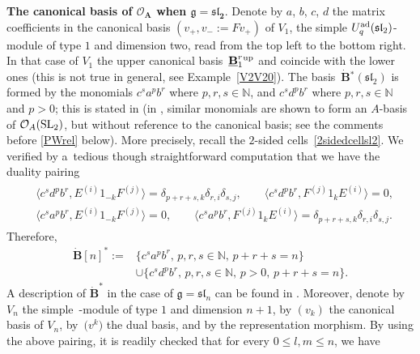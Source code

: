 \documentclass[10pt,a4paper]{amsart}
\numberwithin{equation}{section}
\theoremstyle{definition}
\newcommand{\mn}{\mathbb{N}}
\newcommand{\Oo}{{\mathcal O}}
\begin{document}
{\bf The canonical basis of $\boldsymbol{\Oo_A}$ when $\boldsymbol{\mathfrak{g}={\mathfrak{sl}_2}}$}. Denote by $a$, $b$, $c$, $d$ the matrix coefficients in the canonical basis $(v_+,v_-:=Fv_+)$ of $V_1$, the simple $U_q^{\rm ad}({\mathfrak{sl}_2})$-module of type $1$ and dimension two, read from the top left to the bottom right. In that case of $V_1$ the upper canonical basis~$\underline{\mathbf{B}}_{1}^r{}^{\rm up}$ and  coincide with the lower ones (this is not true in general, see Example~\ref{V2V20}). The basis~$\dot{\mathbf{B}} {}^*({\mathfrak{sl}_2})$ is formed by the monomials $c^sa^pb^r$ where $p,r,s\in \mn$, and $c^sd^pb^r$ where $p,r,s\in \mn$ and $p>0$; this is stated in \cite[Proposition~9.1.1]{Kashiwara2} (in \cite[Proposition~1.3]{DC-L}, similar monomials are shown to form an $A$-basis of $\Oo_A({\rm SL}_2)$, but without reference to the canonical basis; see the comments before \eqref{PWrel} below). More precisely, recall the $2$-sided cells~\eqref{2sidedcellsl2}. We verified by a~tedious though straightforward computation that we have the duality pairing
\begin{gather*}
\begin{split}
& \big\langle c^sd^pb^r, E^{(i)}1_{-k}F^{(j)} \big\rangle = \delta_{p+r+s,k}\delta_{r,i}\delta_{s,j} ,\qquad \big\langle c^sd^pb^r, F^{(j)}1_{k}E^{(i)} \big\rangle =0, \\
& \big\langle c^sa^pb^r, E^{(i)}1_{-k}F^{(j)} \big\rangle = 0 ,\qquad \big\langle c^sa^pb^r, F^{(j)}1_{k}E^{(i)} \big\rangle =\delta_{p+r+s,k}\delta_{r,i}\delta_{s,j}.
\end{split}
\end{gather*}
Therefore, \begin{align*}\dot{\mathbf{B}} [n]^* :={}& \{ c^sa^pb^r, \, p,r,s\in \mn,\, p+r+s=n\} \\&\cup \{ c^{s}d^{p}b^{r},\, p,r,s\in \mn,\, p>0,\, p+r+s=n\}.\end{align*}
A description of $\dot{\mathbf{B}}^*$ in the case of $\mathfrak{g} = {\mathfrak{sl}_n}$ can be found in \cite{Du}. Moreover, denote by $V_n$ the simple~-module of type $1$ and dimension $n+1$, by $(v_k)$ the canonical basis of $V_n$, by~$\big(v^k\big)$ the dual basis, and by  the representation morphism. By using the above pairing, it is readily checked that for every $0\leq l,m\leq n$, we have
\end{document}
